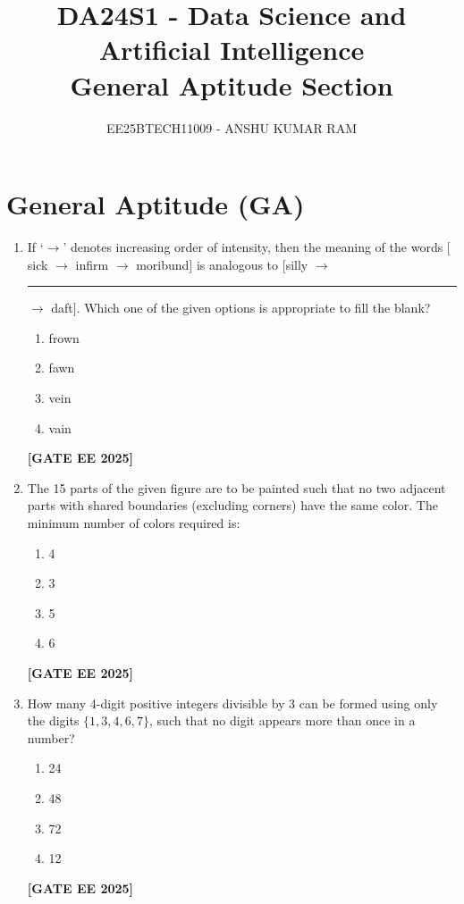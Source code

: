 \documentclass[journal]{IEEEtran}
\newcommand{\qfooter}{%
  \begin{flushright}\footnotesize\textbf{[GATE EE 2025]}\end{flushright}\vspace{1em}%
}
\begin{document}

\vspace{3cm}
\title{DA24S1 - Data Science and Artificial Intelligence\\General Aptitude Section}
\author{EE25BTECH11009 - ANSHU KUMAR RAM}
{\let\newpage\relax\maketitle}

\section*{General Aptitude (GA)}

\begin{enumerate}[leftmargin=*,label=\arabic*.]
\item If ‘$\rightarrow$’ denotes increasing order of intensity, then the meaning of the words $[$sick $\rightarrow$ infirm $\rightarrow$ moribund$]$ is analogous to $[$silly $\rightarrow$ \rule{6em}{0.05em} $\rightarrow$ daft$]$.
Which one of the given options is appropriate to fill the blank?
\begin{multicols}{2}
\begin{enumerate}[label=(\Alph*)]
\item frown
\item fawn
\item vein
\item vain
\end{enumerate}
\qfooter
\end{multicols}

\item The 15 parts of the given figure are to be painted such that no two adjacent parts with shared boundaries (excluding corners) have the same color. The minimum number of colors required is:
\begin{multicols}{2}
\begin{enumerate}[label=(\Alph*)]
\item 4
\item 3
\item 5
\item 6
\end{enumerate}
\qfooter
\end{multicols}

\item How many 4-digit positive integers divisible by 3 can be formed using only the digits $\{1,3,4,6,7\}$, such that no digit appears more than once in a number?
\begin{multicols}{2}
\begin{enumerate}[label=(\Alph*)]
\item 24
\item 48
\item 72
\item 12
\end{enumerate}
\qfooter
\end{multicols}


\end{enumerate}
\end{document}
